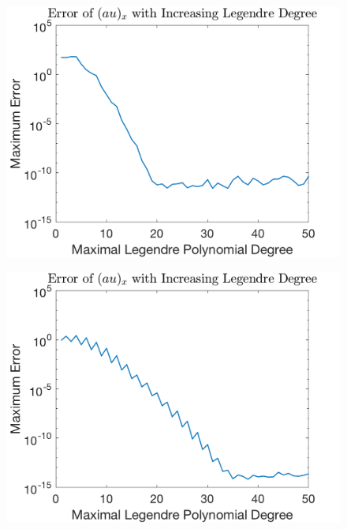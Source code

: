 \documentclass{article}
\begin{document}
\begin{figure}[H]
  \centering
  \begin{minipage}{.4\textwidth}
    \centering
    \includegraphics[width=\linewidth]{plots/exp_cos.png}
    \label{fig:max0}
  \end{minipage}%
  \begin{minipage}{.4\textwidth}
    \centering
    \includegraphics[width=\linewidth]{plots/gaussian.png}
    \label{fig:square0}
  \end{minipage}%
  \begin{minipage}{.4\textwidth}
    \centering

\end{minipage}
\end{figure}
\end{document}

